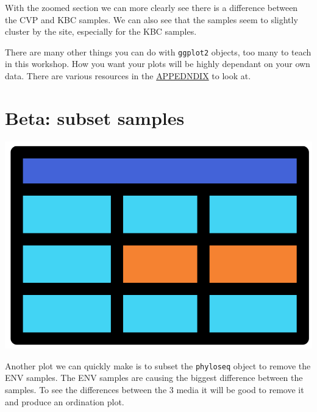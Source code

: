 \documentclass[
]{book}
\begin{document}
With the zoomed section we can more clearly see there is a difference between the CVP and KBC samples.
We can also see that the samples seem to slightly cluster by the site, especially for the KBC samples.

There are many other things you can do with \texttt{ggplot2} objects, too many to teach in this workshop.
How you want your plots will be highly dependant on your own data.
There are various resources in the \protect\hyperlink{ggplot2_appendix}{APPEDNDIX} to look at.

\hypertarget{beta-subset-samples}{%
\section{Beta: subset samples}\label{beta-subset-samples}}

\includegraphics{figures/R_subset.png}

Another plot we can quickly make is to subset the \texttt{phyloseq} object to remove the ENV samples.
The ENV samples are causing the biggest difference between the samples.
To see the differences between the 3 media it will be good to remove it and produce an ordination plot.
\end{document}
